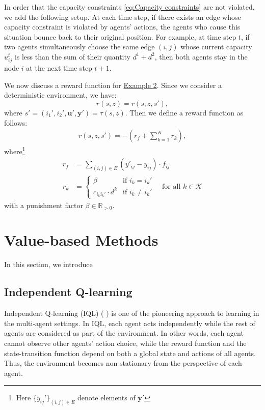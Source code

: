 In order that the capacity constraints \eqref{eq:Capacity constraints} are not violated, we add the following setup. At each time step, if there exists an edge whose capacity constraint is violated by agents' actions, the agents who cause this situation bounce back to their original position. For example, at time step $t$, if two agents simultaneously choose the same edge $(i,j)$ whose current capacity $u_{ij}^t$ is less than the sum of their quantity $d^1 + d^2$, then both agents stay in the node $i$ at the next time step $t+1$.

We now discuss a reward function for \hyperref[fig:Example2]{Example 2}. Since we consider a deterministic environment, we have:
$$r(s,z) = r(s, z, s'),$$
where $s' = (i_1', i_2', \boldsymbol{u}', \boldsymbol{y}')= \tau(s,z)$. Then we define a reward function as follows:
\begin{align}
    r(s,z,s') = - \left(r_f + \sum_{k=1}^
    Kr_k\right),
\end{align}
where\footnote{Here $\{y_{ij}'\}_{(i,j)\in E}$ denote elements of $\boldsymbol{y}'$} \begin{align}
    r_f &= \sum_{(i,j)\in E}(y'_{ij}-y_{ij}) \cdot f_{ij}\\
    r_k &= \begin{cases}
    \beta &\text{if } i_k = i_k'\\
    c_{i_k i_k'}\cdot d^k &\text{if } i_k \neq i_k'
    \end{cases} \quad \text{for all } k \in \mathcal{K}
\end{align}
with a punishment factor $\beta \in \mathbb{R}_{>0}$.
\clearpage
\section{Value-based Methods}
In this section, we introduce


\subsection{Independent Q-learning}
Independent Q-learning (IQL) (\citeauthor{tan1993multi} \cite{tan1993multi}) is one of the pioneering approach to learning in the multi-agent settings. In IQL, each agent acts independently while the rest of agents are considered as part of the environment. In other words, each agent cannot observe other agents' action choice, while the reward function and the state-transition function depend on both a global state and actions of all agents. Thus, the environment becomes non-stationary from the perspective of each agent.

